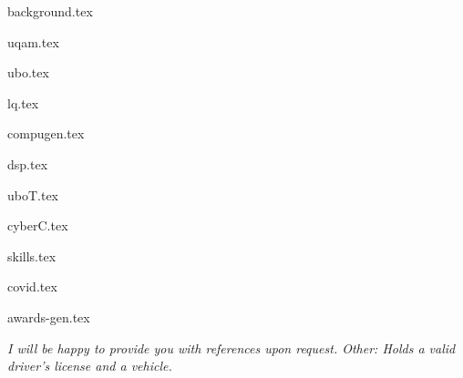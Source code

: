 \documentclass[11pt]{article}
\begin{document}
{background.tex}


{uqam.tex}

{ubo.tex}


{lq.tex}

{compugen.tex}

{dsp.tex}

{uboT.tex}

{cyberC.tex}


{skills.tex}


{covid.tex}


{awards-gen.tex}

\textit{I will be happy to provide you with references upon request. 
Other: Holds a valid driver's license and a vehicle.} \par
\end{document}

